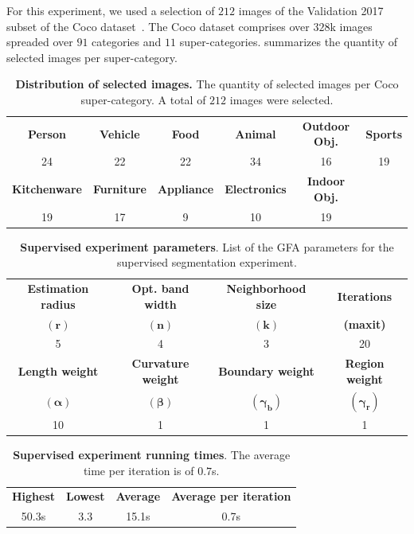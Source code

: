 \documentclass[review]{siamart220329}
\begin{document}
For this experiment, we used a selection of $212$ images of the Validation 2017
subset of the Coco dataset~\cite{lin2014microsoft}. The Coco dataset comprises
over $328$k images spreaded over $91$ categories and $11$ super-categories.
 summarizes the quantity of selected
images per super-category. 
%
%
\begin{table}[h!]
\footnotesize
    \caption{\textbf{Distribution of selected images.} The quantity of selected
    images per Coco super-category. A total of $212$ images were
    selected.}\label{tab:image-categories-distribution}
\begin{tabular}{cccccc}
\textbf{Person} & \textbf{Vehicle} & \textbf{Food} & \textbf{Animal} & \textbf{Outdoor Obj.} & \textbf{Sports} \\
24 & 22 & 22 & 34 & 16 & 19 \\[1em]
\textbf{Kitchenware} & \textbf{Furniture} & \textbf{Appliance} & \textbf{Electronics} & \textbf{Indoor Obj.} & \\
19 & 17 & 9 & 10 & 19 &
\end{tabular}
\end{table}
%
%
\begin{table}[h!]
\center
\footnotesize
\caption{\textbf{Supervised experiment parameters}. List of the GFA
parameters for the supervised segmentation
experiment.}
\label{tab:coco-experiment-parameter}
\begin{tabular}{cccc}
\textbf{Estimation radius} & \textbf{Opt. band width} & \textbf{Neighborhood size} & \textbf{Iterations} \\
$\mathbf{(r)}$ & $\mathbf{(n)}$ & $\mathbf{(k)}$ & \textbf{(maxit)}\\
5 & 4 & 3 & 20\\[1em]
\textbf{Length weight} & \textbf{Curvature weight} & \textbf{Boundary weight} & \textbf{Region weight}\\
$\boldsymbol{(\alpha)}$ & $\boldsymbol{(\beta)}$ & $\boldsymbol{(\gamma_b)}$ & $\boldsymbol{(\gamma_r)}$\\
10 & 1 & 1 & 1
\end{tabular}
\end{table}
%
%
\begin{table}[h!]
\footnotesize
\caption{\textbf{Supervised experiment running times}. The average time per
iteration is of $0.7$s.}
\label{tab:coco-experiment-running-time}
\center
\begin{tabular}{cccc}
\textbf{Highest} & \textbf{Lowest} & \textbf{Average} & \textbf{Average per iteration} \\
50.3s & 3.3 & 15.1s & 0.7s\\
\end{tabular}
\end{table}
\end{document}
